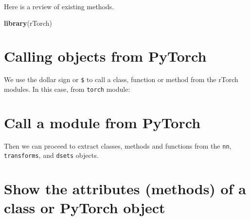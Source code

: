 \documentclass[]{book}
\newenvironment{Shaded}{\begin{snugshade}}{\end{snugshade}}
\newcommand{\CommentTok}[1]{\textcolor[rgb]{0.56,0.35,0.01}{\textit{#1}}}
\newcommand{\KeywordTok}[1]{\textcolor[rgb]{0.13,0.29,0.53}{\textbf{#1}}}
\newcommand{\NormalTok}[1]{#1}
\newcommand{\OperatorTok}[1]{\textcolor[rgb]{0.81,0.36,0.00}{\textbf{#1}}}
\newcommand{\StringTok}[1]{\textcolor[rgb]{0.31,0.60,0.02}{#1}}
\begin{document}
Here is a review of existing methods.

\begin{Shaded}
\begin{Highlighting}[]
\KeywordTok{library}\NormalTok{(rTorch)}
\end{Highlighting}
\end{Shaded}

\hypertarget{calling-objects-from-pytorch}{%
\section{Calling objects from PyTorch}\label{calling-objects-from-pytorch}}

We use the dollar sign or \texttt{\$} to call a class, function or method from the rTorch modules. In this case, from \texttt{torch} module:

\begin{Shaded}
\end{Shaded}

\hypertarget{call-a-module-from-pytorch}{%
\section{Call a module from PyTorch}\label{call-a-module-from-pytorch}}

\begin{Shaded}
\end{Shaded}

Then we can proceed to extract classes, methods and functions from the \texttt{nn}, \texttt{transforms}, and \texttt{dsets} objects.

\hypertarget{show-the-attributes-methods-of-a-class-or-pytorch-object}{%
\section{Show the attributes (methods) of a class or PyTorch object}\label{show-the-attributes-methods-of-a-class-or-pytorch-object}}
\end{document}
